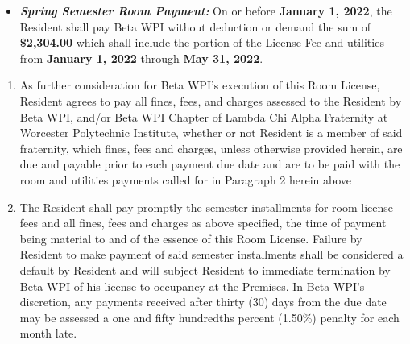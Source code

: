 \documentclass[legalpaper, 12pt]{article}
\begin{document}
\begin{enumerate}
\begin{itemize}
                        \item \textbf{\textit{Spring Semester Room Payment:}} On
                                or before \textbf{January 1, 2022}, the Resident
                                shall pay Beta WPI without deduction or demand
                                the sum of \textbf{\$2,304.00} which shall
                                include the portion of the License Fee and
                                utilities from \textbf{January 1, 2022} through
                                \textbf{May 31, 2022}.

        \end{itemize}

        \begin{enumerate}[label=\Alph*.] 

                \item As further consideration for Beta WPI’s execution of this
                        Room License, Resident agrees to pay all fines, fees,
                        and charges assessed to the Resident by Beta WPI, and/or
                        Beta WPI Chapter of Lambda Chi Alpha Fraternity at
                        Worcester Polytechnic Institute, whether or not Resident
                        is a member of said fraternity, which fines, fees and
                        charges, unless otherwise provided herein, are due and
                        payable prior to each payment due date and are to be
                        paid with the room and utilities payments called for in
                        Paragraph 2 herein above 

                \item The Resident shall pay promptly the semester installments
                        for room license fees and all fines, fees and charges as
                        above specified, the time of payment being material to
                        and of the essence of this Room License.  Failure by
                        Resident to make payment of said semester installments
                        shall be considered a default by Resident and will
                        subject Resident to immediate termination by Beta WPI of
                        his license to occupancy at the Premises.  In Beta WPI’s
                        discretion, any payments received after thirty (30) days
                        from the due date may be assessed a one and fifty
                        hundredths percent (1.50\%) penalty for each month late. 


\end{enumerate}
\end{enumerate}
\end{document}
